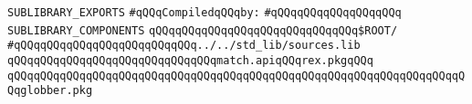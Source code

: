 \label{src/lib/tk/src/toolkit/regExp/sources.sublib}
\verb|SUBLIBRARY_EXPORTS|\newline
\newline
\verb|#qQQqCompiledqQQqby:|\newline
\verb|#qQQqqQQqqQQqqQQqqQQq|\newline
\newline
\verb|SUBLIBRARY_COMPONENTS|\newline
\newline
\verb|qQQqqQQqqQQqqQQqqQQqqQQqqQQqqQQq$ROOT/|\newline
\verb|#qQQqqQQqqQQqqQQqqQQqqQQqqQQq../../std_lib/sources.lib|\newline
\newline
\verb|qQQqqQQqqQQqqQQqqQQqqQQqqQQqqQQqmatch.apiqQQqrex.pkgqQQq|\newline
\verb|qQQqqQQqqQQqqQQqqQQqqQQqqQQqqQQqqQQqqQQqqQQqqQQqqQQqqQQqqQQqqQQqqQQqqQQqglobber.pkg|\newline
\newline
\newline
\newline

